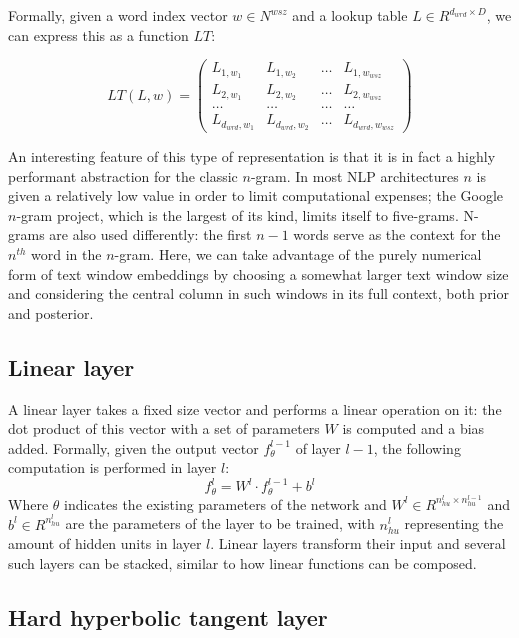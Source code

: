 Formally, given a word index vector $w \in N^{wsz}$ and a lookup table
$L \in R^{d_{wrd} \times D}$, we can express this as a function
$LT$:

\begin{equation} \label{eq:ltmatrix} LT(L, w) =
\left( \begin{array}{cccc} L_{1,w_1} & L_{1,w_2} & \ldots &
L_{1,w_{wsz}} \\ L_{2,w_1} & L_{2,w_2} & \ldots & L_{2,w_{wsz}} \\
\ldots & \ldots & \ldots & \ldots \\ L_{d_{wrd},w_1} & L_{d_{wrd},w_2}
& \ldots & L_{d_{wrd},w_{wsz}} \end{array} \right)
\end{equation}

An interesting feature of this type of representation is that it is in
fact a highly performant abstraction for the classic $n$-gram. In most
NLP architectures $n$ is given a relatively low value in order to
limit computational expenses; the Google $n$-gram project, which is the
largest of its kind, limits itself to five-grams. N-grams are also
used differently: the first $n - 1$ words serve as the context for the
$n^{th}$ word in the $n$-gram. Here, we can take advantage of the
purely numerical form of text window embeddings by choosing a somewhat
larger text window size and considering the central column in such
windows in its full context, both prior and posterior.

\subsection{Linear layer}
A linear layer takes a fixed size vector and performs a linear
operation on it: the dot product of this vector with a set of
parameters $W$ is computed and a bias added. Formally, given the
output vector $f^{l-1}_\theta$ of layer $l-1$, the following
computation is performed in layer $l$:
\begin{equation}
  f^l_\theta = W^l \cdot f^{l-1}_\theta + b^l
\end{equation}
Where $\theta$ indicates the existing parameters of the network and
$W^l \in R^{n^l_{hu} \times n^{l-1}_{hu}} $ and $b^l \in R^{n^l_{hu}} $
are the parameters of the layer to be trained, with $n^l_{hu}$
representing the amount of hidden units in layer $l$. Linear layers
transform their input and several such layers can be stacked, similar
to how linear functions can be composed.

\subsection{Hard hyperbolic tangent layer}

